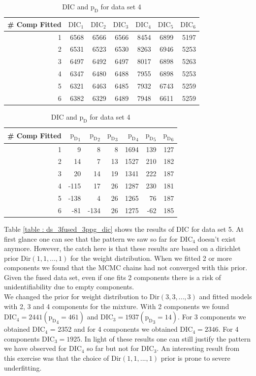 \begin{table}[!htb]
\centering
\caption{DIC and $\text{p}_\text{D}$ for data set 4}
\label{table : ds_3fused_10ppg_dic}
\begin{tabular}{@{}rrrrrrr@{}}
\toprule
\# Comp Fitted & $\text{DIC}_1$ & $\text{DIC}_2$  & $\text{DIC}_3$  & $\text{DIC}_4$  & $\text{DIC}_5$  & $\text{DIC}_6$  \\ \midrule
1 & 6568 & 6566 & 6566 & 8454 & 6899 & 5197 \\
2 & 6531 & 6523 & 6530 & 8263 & 6946 & 5253 \\
3 & 6497 & 6492 & 6497 & 8017 & 6898 & 5263 \\
4 & 6347 & 6480 & 6488 & 7955 & 6898 & 5253 \\
5 & 6321 & 6463 & 6485 & 7932 & 6743 & 5259 \\
6 & 6382 & 6329 & 6489 & 7948 & 6611 & 5259 \\ \bottomrule
\end{tabular}

\begin{tabular}{@{}rrrrrrr@{}}
\toprule
\# Comp Fitted & ${\text{p}_\text{D}}_1$ & ${\text{p}_\text{D}}_2$ & ${\text{p}_\text{D}}_3$ & ${\text{p}_\text{D}}_4$ & ${\text{p}_\text{D}}_5$ & ${\text{p}_\text{D}}_6$ \\ \midrule
1 & 9 & 8 & 8 & 1694 & 139 & 127 \\
2 & 14 & 7 & 13 & 1527 & 210 & 182 \\
3 & 20 & 14 & 19 & 1341 & 222 & 187 \\
4 & -115 & 17 & 26 & 1287 & 230 & 181 \\
5 & -138 & 4 & 26 & 1265 & 76 & 187 \\
6 & -81 & -134 & 26 & 1275 & -62 & 185 \\ \bottomrule
\end{tabular}
\end{table}

Table \ref{table : ds_3fused_3ppg_dic} shows the results of DIC for data set 5. At first glance one can see that the pattern we saw so far for $\text{DIC}_4$ doesn't exist anymore. However, the catch here is that these results are based on a dirichlet prior $\text{Dir}(1, 1, ..., 1)$ for the weight distribution. When we fitted 2 or more components we found that the MCMC chains had not converged with this prior. Given the fused data set, even if one fits 2 components there is a risk of unidentifiability due to empty components.\\

We changed the prior for weight distribution to $\text{Dir}(3, 3, ..., 3)$ and fitted models with 2, 3 and 4 components for the mixture. With 2 components we found $\text{DIC}_4 = 2441 ({\text{p}_\text{D}}_4 = 461)$ and $\text{DIC}_3 = 1937 ({\text{p}_\text{D}}_3 = 14)$. For 3 components we obtained $\text{DIC}_4$ = 2352 and for 4 components we obtained $\text{DIC}_4 = 2346$. For 4 components $\text{DIC}_3 = 1925$. In light of these results one can still justify the pattern we have observed for $\text{DIC}_4$ so far but not for $\text{DIC}_3$. An interesting result from this exercise was that the choice of $\text{Dir}(1, 1, ..., 1)$ prior is prone to severe underfitting.

